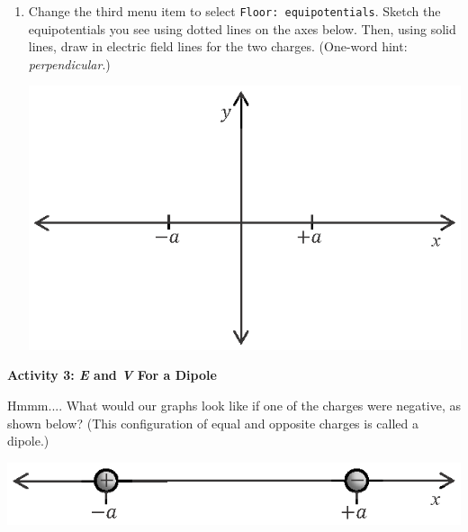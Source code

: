 \begin{enumerate}[wide, label=(\emph{\alph*})]
\item  Change the third menu item to select \verb!Floor: equipotentials!.  Sketch the equipotentials you see using dotted lines on the axes below.  Then, using solid lines, draw in electric field lines for the two charges.  (One-word hint: \textit{perpendicular}.)
\begin{center}
\includegraphics{potential_superposition/activity_2_3_figs/x_y_axes.eps}
\end{center}
\end{enumerate}

\pagebreak[3]
\textbf{Activity 3: \textit{E} and \textit{V} For a Dipole}

Hmmm.... What would our graphs look like if one of the charges were negative, as shown below?  (This configuration of equal and opposite charges is called a dipole.)
\begin{center}
\includegraphics{potential_superposition/activity_2_3_figs/charges_on_x_axis_dipole.eps}
\end{center}

